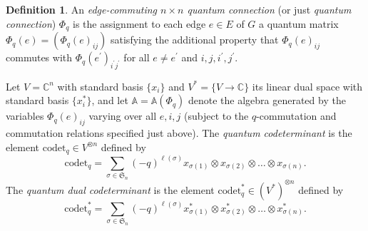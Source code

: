 \documentclass[12pt, reqno]{amsart}
\theoremstyle{definition}
\newtheorem{defi}[theo]{Definition}
\begin{document}
\begin{defi}\label{defi:planarquantumtrace}
An \emph{edge-commuting $n\times n$ quantum connection} (or just \emph{quantum connection}) $\Phi_q$ is the assignment to each edge $e\in E$ of $G$ a quantum matrix $\Phi_q(e)=(\Phi_q(e)_{ij})$ satisfying the additional property that $\Phi_q(e)_{ij}$ commutes with $\Phi_q(e^\prime)_{i^\prime j^\prime}$ for all $e\neq e^\prime$ and $i,j,i^\prime,j^\prime$.  

Let $V=\mathbb{C}^n$ with standard basis $\{x_i\}$ and $V^*=\{V\to\mathbb{C}\}$ its linear dual space with standard basis  $\{x^*_i\}$, and let $\mathbb{A}=\mathbb{A}(\Phi_q)$ denote the algebra generated by the variables $\Phi_q(e)_{ij}$ varying over all $e,i,j$ (subject to the $q$-commutation and commutation relations specified just above).  The \emph{quantum codeterminant} is the element $\mathrm{codet}_q\in V^{\otimes n}$   defined by 
$$
\mathrm{codet}_q=\sum_{\sigma\in \mathfrak{S}_n}(-q)^{\ell(\sigma)}x_{\sigma(1)}\otimes x_{\sigma(2)}\otimes\dots\otimes x_{\sigma(n)}.
$$  
The \emph{quantum dual codeterminant} is the element $\mathrm{codet}_q^*\in(V^*)^{\otimes n}$ defined by 
$$
\mathrm{codet}^*_q=\sum_{\sigma\in \mathfrak{S}_n}(-q)^{\ell(\sigma)}x^*_{\sigma(1)}\otimes x^*_{\sigma(2)}\otimes\dots\otimes x^*_{\sigma(n)}.
$$


\end{defi}
\end{document}
